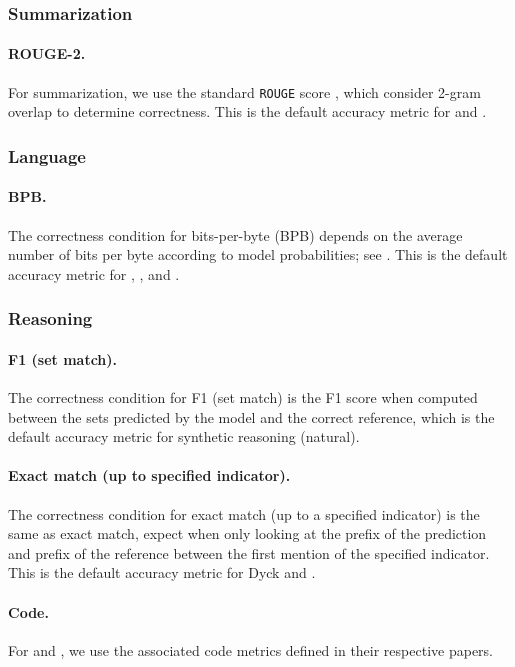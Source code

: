 \subsubsection{Summarization}
\paragraph{ROUGE-2.} 
For summarization, we use the standard \texttt{ROUGE} score \citep{lin-2004-rouge}, which consider 2-gram overlap to determine correctness. 
This is the default accuracy metric for \cnndm and \xsum.

\subsubsection{Language}
\paragraph{BPB.} 
The correctness condition for bits-per-byte (BPB) depends on the average number of bits per byte according to model probabilities; see \citet{gao2021thepile}.  
This is the default accuracy metric for \pile, \ice, and \twitteraae.

\subsubsection{Reasoning}
\paragraph{F1 (set match).} 
The correctness condition for F1 (set match) is the F1 score when computed between the sets predicted by the model and the correct reference, which is the default accuracy metric for synthetic reasoning (natural).

\paragraph{Exact match (up to specified indicator).} 
The correctness condition for exact match (up to a specified indicator) is the same as exact match, expect when only looking at the prefix of the prediction and prefix of the reference between the first mention of the specified indicator.
This is the default accuracy metric for Dyck and \gsm. 

\paragraph{Code.}
For \humaneval \citep{chen2021codex} and \codeapps \citep{hendrycks2021measuring}, we use the associated code metrics defined in their respective papers.

